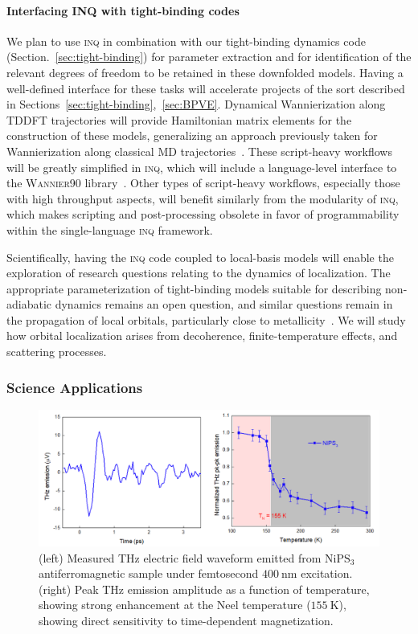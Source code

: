 \paragraph{Interfacing \textsc{INQ} with tight-binding codes}\label{sec:future-tb}

We plan to use \textsc{inq} in combination with our tight-binding dynamics code (Section.~\ref{sec:tight-binding}) for parameter extraction and for identification of the relevant degrees of freedom to be retained in these downfolded models. 
Having a well-defined interface for these tasks will accelerate projects of the sort described in Sections~\ref{sec:tight-binding},~\ref{sec:BPVE}. Dynamical Wannierization along TDDFT trajectories will provide Hamiltonian matrix elements for the construction of these models, generalizing an approach previously taken for Wannierization along classical MD trajectories~\cite{Abramovitch2021}. 
These script-heavy workflows will be greatly simplified in \textsc{inq}, which will include a language-level interface to the \textsc{Wannier90} library~\cite{Mostofi2008}. 
Other types of script-heavy workflows, especially those with high throughput aspects, will benefit similarly from the modularity of \textsc{inq}, which makes scripting and post-processing obsolete in favor of programmability within the single-language \textsc{inq} framework.

Scientifically, having the \textsc{inq} code coupled to local-basis models will enable the exploration of research questions relating to the dynamics of localization. 
The appropriate parameterization of tight-binding models suitable for describing non-adiabatic dynamics remains an open question, and similar questions remain in the propagation of local orbitals, particularly close to metallicity~\cite{Yost2019}. 
We will study how orbital localization arises from decoherence, finite-temperature effects, and scattering processes.  

\subsubsection{Science Applications}
\begin{figure}[ht]
	\centering\includegraphics[width=0.7\linewidth]{figures/NiPS3}
	\caption{
		(left)  Measured THz electric field waveform emitted from \(\mathrm{NiPS_3}\) antiferromagnetic sample under femtosecond \(400~\mathrm{nm}\) excitation.
		(right) Peak THz emission amplitude as a function of temperature, showing strong enhancement at the Neel temperature (\(155~\mathrm{K}\)), showing direct sensitivity to time-dependent magnetization.
	}
	\label{fig:NiPS3}
\end{figure}

